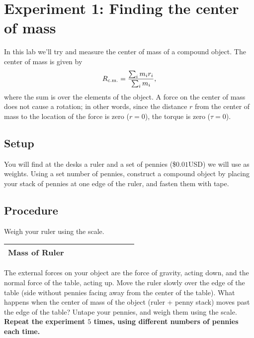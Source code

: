 \documentclass[12pt]{article}
\begin{document}
\bigskip

\bigskip

\section{Experiment 1: Finding the center of mass}
In this lab we'll try and measure the center of mass of a compound object. The center of mass is given by
\begin{equation}
\label{eq: center of mass}
R_{\rm c.m.} = \frac{\sum_{i} m_i r_i}{\sum_i m_i},
\end{equation}
where the sum is over the elements of the object. A force on the center of mass does not cause a rotation; in other words, since the distance $r$ from the center of mass to the location of the force is zero ($r = 0$), the torque is zero ($\tau = 0$).
\subsection{Setup}
You will find at the desks a ruler and a set of pennies (\$$0.01$USD) we will use as weights. Using a set number of pennies, construct a compound object by placing your stack of pennies at one edge of the ruler, and fasten them with tape.
\subsection{Procedure}
Weigh your ruler using the scale.
\begin{table}[h!]
\centering
\begin{tabular}{|c|c|}
\hline
Mass of Ruler & \,\,\,\,\,\,\,\,\,\,\,\,\,\,\,\,\,\,\,\,\,\,\,\,\,\,\,\,\,\,\,\,\,\,\,\,\,\,\,\,\,\,\,\,\\
\hline
\end{tabular}
\end{table}

The external forces on your object are the force of gravity, acting down, and the normal force of the table, acting up. Move the ruler slowly over the edge of the table (side without pennies facing away from the center of the table). What happens when the center of mass of the object (ruler + penny stack) moves past the edge of the table? Untape your pennies, and weigh them using the scale.
{\bf Repeat the experiment $5$ times, using different numbers of pennies each time.}
\end{document}
